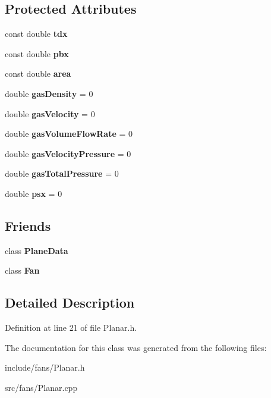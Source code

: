 \subsection*{Protected Attributes}
\begin{DoxyCompactItemize}
\item 
\mbox{\label{class_planar_a7e2b4d44fddc320e834163c16266c44e}} 
const double {\bfseries tdx}
\item 
\mbox{\label{class_planar_a18ed8bdd4d3e0766c349cf3ed1482a40}} 
const double {\bfseries pbx}
\item 
\mbox{\label{class_planar_a561590931d1cb7b592eeba9f3685d3c3}} 
const double {\bfseries area}
\item 
\mbox{\label{class_planar_a3585f60cf8a2a9e4b80954118337c8cf}} 
double {\bfseries gas\+Density} = 0
\item 
\mbox{\label{class_planar_adf99a402e9af6a851ee94bd8dad5700a}} 
double {\bfseries gas\+Velocity} = 0
\item 
\mbox{\label{class_planar_a6597ec3a9de6863ecfe3c5e923048783}} 
double {\bfseries gas\+Volume\+Flow\+Rate} = 0
\item 
\mbox{\label{class_planar_a4bec44a97d38f8b98d3839c885350512}} 
double {\bfseries gas\+Velocity\+Pressure} = 0
\item 
\mbox{\label{class_planar_a67711087a384aa3165fb7990e72193c5}} 
double {\bfseries gas\+Total\+Pressure} = 0
\item 
\mbox{\label{class_planar_a1ae78fa44af29939b09ad5262788b981}} 
double {\bfseries psx} = 0
\end{DoxyCompactItemize}
\subsection*{Friends}
\begin{DoxyCompactItemize}
\item 
\mbox{\label{class_planar_a28ff438eefb65e97bddb4051dd0a0112}} 
class {\bfseries Plane\+Data}
\item 
\mbox{\label{class_planar_a0a305abd4183ca4b5d3adb1b563378d7}} 
class {\bfseries Fan}
\end{DoxyCompactItemize}


\subsection{Detailed Description}


Definition at line 21 of file Planar.\+h.



The documentation for this class was generated from the following files\+:\begin{DoxyCompactItemize}
\item 
include/fans/Planar.\+h\item 
src/fans/Planar.\+cpp\end{DoxyCompactItemize}
